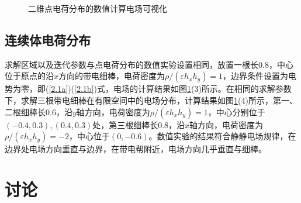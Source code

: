 \documentclass{article} %
\begin{document}
\begin{figure}[ht]
\begin{center}
    \end{center}
    \caption{二维点电荷分布的数值计算电场可视化}
    \label{F2}
\end{figure}

\subsection{连续体电荷分布}
求解区域以及迭代参数与点电荷分布的数值实验设置相同，放置一根长0.8，中心位于原点的沿$x$方向的带电细棒，电荷密度为$\rho/(\varepsilon h_x h_y)=1$，边界条件设置为电势为零，即(\ref{2.1a})(\ref{2.1b})式，电场的计算结果如图\ref{F2}(3)所示。在相同的求解参数下，求解三根带电细棒在有限空间中的电场分布，计算结果如图\ref{F2}(4)所示，第一、二根细棒长0.6，沿$y$轴方向，电荷密度为$\rho/(\varepsilon h_x h_y)=1$，中心分别位于$(-0.4,0.3),(0.4,0.3)$处，第三根细棒长0.8，沿$x$轴方向，电荷密度为$\rho/(\varepsilon h_x h_y)=-2$，中心位于$(0,-0.6)$。数值实验的结果符合静静电场规律，在边界处电场方向垂直与边界，在带电帮附近，电场方向几乎垂直与细棒。

\section{讨论}
\end{document}
